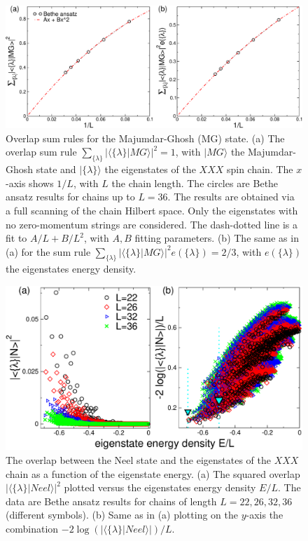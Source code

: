 \documentclass[11pt]{iopart}
\begin{document}
\begin{figure}[t]
\begin{center}
\includegraphics[width=.9\textwidth]{./draft_figs/Dimer}
\end{center}
\caption{ Overlap sum rules for the Majumdar-Ghosh (MG) state. (a) The 
 overlap sum rule $\sum_{\{\lambda\}}|\langle\{\lambda\}|MG\rangle|^2=1$, 
 with $|MG\rangle$ the Majumdar-Ghosh state and $|\{\lambda\}\rangle$ 
 the eigenstates  of the $XXX$ spin chain. The $x$-axis shows $1/L$, 
 with $L$ the chain length. The circles are Bethe ansatz results for 
 chains up to $L=36$. The results are obtained via a full scanning of 
 the chain Hilbert space. Only the eigenstates with no zero-momentum 
 strings are considered. The dash-dotted line is a fit to $A/L+B/L^2$, 
 with $A,B$ fitting parameters. (b) The same as in (a) for the sum 
 rule $\sum_{\{\lambda\}}|\langle\{\lambda\}|MG\rangle|^2e(\{\lambda\})=
 2/3$, with $e(\{\lambda\})$  the eigenstates energy density. 
}
\label{fig3-dimer-sr}
\end{figure}


\begin{figure}[t]
\begin{center}
\includegraphics[width=.75\textwidth]{./draft_figs/Neel_over_ener}
\end{center}
\caption{ The overlap between the Neel state and the eigenstates of the 
 $XXX$ chain as a function of the eigenstate energy. (a) The squared 
 overlap $|\langle\{\lambda\}|Neel\rangle|^2$ plotted versus the 
 eigenstates energy density $E/L$. The data are Bethe ansatz results 
 for chains of length $L=22,26,32,36$ (different symbols). (b) Same as 
 in (a) plotting on the $y$-axis the combination $-2\log(|\langle\{
 \lambda\}|Neel\rangle|)/L$. 
}
\label{fig4-neel-ener}
\end{figure}
\end{document}
